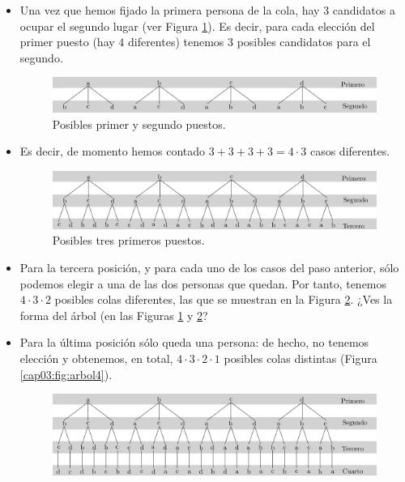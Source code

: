 \begin{Ejemplo}
\begin{itemize}
        \item Una vez que hemos fijado la primera persona de la cola, hay 3 candidatos a ocupar el segundo lugar (ver Figura \ref{cap03:fig:arbol2}). Es decir, para cada elecci\'on del primer puesto (hay $4$ diferentes) tenemos 3 posibles candidatos para el segundo.
        	\begin{center}
            \begin{figure}[h!]	
            \includegraphics[width=13cm]{../fig/Cap03-Permutaciones42.png}
            \caption{Posibles primer y segundo puestos.}\label{cap03:fig:arbol2}
            \end{figure}
            \end{center}
        \item Es decir, de momento hemos contado $3+3+3+3=4\cdot 3$ casos diferentes.
            \begin{center}
            \begin{figure}[h!]	
            \includegraphics[width=13cm]{../fig/Cap03-Permutaciones43.png}
            \caption{Posibles tres primeros puestos.}\label{cap03:fig:arbol3}
            \end{figure}
            \end{center}
        \item Para la tercera posici\'on, y para cada uno de los casos del paso anterior, s\'olo podemos elegir a una de las dos personas que quedan. Por tanto, tenemos $4\cdot 3\cdot 2$ posibles colas diferentes, las que se muestran en la Figura \ref{cap03:fig:arbol3}. ¿Ves la forma del \'arbol (en las Figuras \ref{cap03:fig:arbol2} y \ref{cap03:fig:arbol3}?
        \item Para la \'ultima posici\'on s\'olo queda una persona: de hecho, no tenemos elección y obtenemos, en total, $4\cdot 3\cdot 2\cdot 1$ posibles colas distintas (Figura \ref{cap03:fig:arbol4}).
    		\begin{center}
            \begin{figure}[h!]	
            \includegraphics[width=13cm]{../fig/Cap03-Permutaciones44.png}

\end{figure}
\end{center}
\end{itemize}
\end{Ejemplo}
